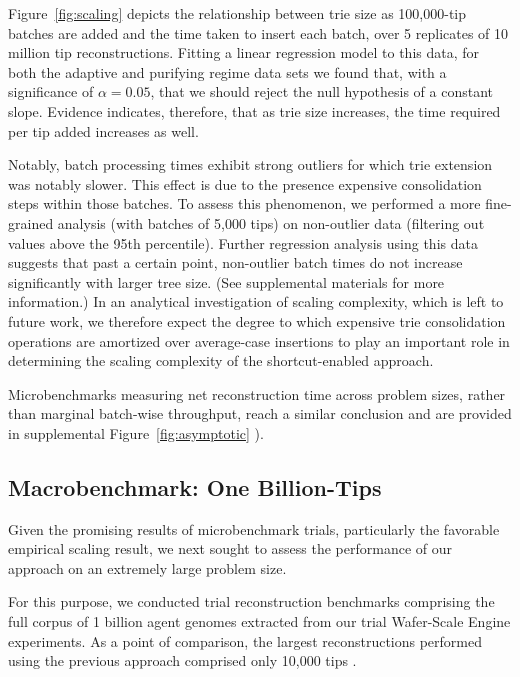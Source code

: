 Figure~\ref{fig:scaling} depicts the relationship between trie size as 100,000-tip batches are added and the time taken to insert each batch, over 5 replicates of 10 million tip reconstructions.
Fitting a linear regression model to this data, for both the adaptive and purifying regime data sets we found that, with a significance of $\alpha = 0.05$, that we should reject the null hypothesis of a constant slope.
Evidence indicates, therefore, that as trie size increases, the time required per tip added increases as well.

Notably, batch processing times exhibit strong outliers for which trie extension was notably slower.
This effect is due to the presence expensive consolidation steps within those batches.
To assess this phenomenon, we performed a more fine-grained analysis (with batches of 5,000 tips) on non-outlier data (filtering out values above the 95th percentile).
Further regression analysis using this data suggests that past a certain point, non-outlier batch times do not increase significantly with larger tree size.
(See supplemental materials \citep{supplemental} for more information.)
In an analytical investigation of scaling complexity, which is left to future work, we therefore expect the degree to which expensive trie consolidation operations are amortized over average-case insertions to play an important role in determining the scaling complexity of the shortcut-enabled approach.

Microbenchmarks measuring net reconstruction time across problem sizes, rather than marginal batch-wise throughput, reach a similar conclusion and are provided in supplemental Figure~\ref{fig:asymptotic} \citep{supplemental}).

\subsection{Macrobenchmark: One Billion-Tips}



Given the promising results of microbenchmark trials, particularly the favorable empirical scaling result, we next sought to assess the performance of our approach on an extremely large problem size.

For this purpose, we conducted trial reconstruction benchmarks comprising the full corpus of 1 billion agent genomes extracted from our trial Wafer-Scale Engine experiments.
As a point of comparison, the largest reconstructions performed using the previous approach comprised only 10,000 tips \citep{moreno2024trackable}.

